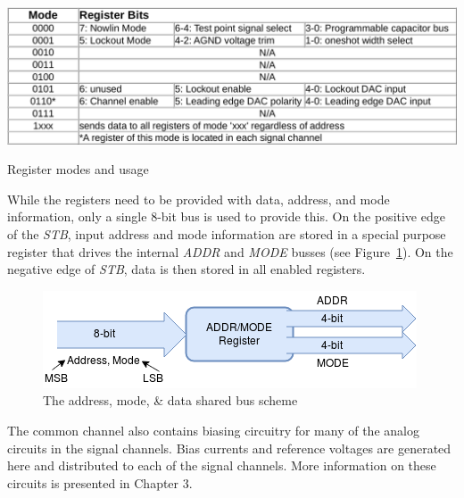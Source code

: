 \documentclass[12pt,oneside,final]{siuethesis}
\theoremstyle{definition}
\begin{document}
\begin{table}[htbp!]
\centering
\includegraphics[scale=.35,keepaspectratio=true]{../data/modes.png} 
\caption{Register modes and usage}
\label{tab:modes}
\end{table}

\par While the registers need to be provided with data, address, and mode information, only a single 8-bit bus is used to provide this. On the positive edge of the \emph{STB}, input address and mode information are stored in a special purpose register that drives the internal \emph{ADDR} and \emph{MODE} busses (see Figure~\ref{fig:addrmode}). On the negative edge of \emph{STB}, data is then stored in all enabled registers.

\begin{figure}[htbp!]
\centering
\includegraphics[scale=.7,keepaspectratio=true]{./ch2_figures/data_bus.png} 
\caption{The address, mode, \& data shared bus scheme}
\label{fig:addrmode}
\end{figure}


\par The common channel also contains biasing circuitry for many of the analog circuits in the signal channels. Bias currents and reference voltages are generated here and distributed to each of the signal channels. More information on these circuits is presented in Chapter 3.
\end{document}

